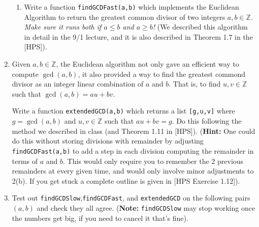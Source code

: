 \documentclass[11pt]{article}
\newcommand{\bZ}{\mathbb{Z}}
\begin{document}
\begin{enumerate}
{\begin{enumerate}
{    }
    \item{
    Write a function \verb|findGCDFast(a,b)| which implements the Euclidean Algorithm to return the greatest common divisor of two integers $a,b\in\bZ$.  \textit{Make sure it runs both if $a\le b$ and $a\ge b$!} (We described this algorithm in detail in the 9/1 lecture, and it is also described in Theorem 1.7 in the [HPS]).
    }
  \end{enumerate}
  }
  \item{
  Given $a,b\in\bZ$, the Euclidean algorithm not only gave an efficient way to compute $\gcd(a,b)$, it also provided a way to find the greatest commond divisor as an integer linear combination of $a$ and $b$.  That is, to find $u,v\in\bZ$ such that $\gcd(a,b) = au+bv$.

  Write a function \verb|extendedGCD(a,b)| which returns a list \verb|[g,u,v]| where $g=\gcd(a,b)$ and $u,v\in\bZ$ such that $au+bv = g$.  Do this following the method we described in class (and Theorem 1.11 in [HPS]).  (\textbf{Hint:} One could do this without storing divisions with remainder by adjusting \verb|findGCDFast(a,b)| to add a step in each division computing the remainder in terms of $a$ and $b$.  This would only require you to remember the 2 previous remainders at every given time, and would only involve minor adjustments to 2(b).  If you get stuck a complete outline is given in [HPS Exercise 1.12]).
  }
  \item{
  Test out \verb|findGCDSlow|,\verb|findGCDFast|, and \verb|extendedGCD| on the following pairs $(a,b)$ and check they all agree.  (\textbf{Note:} \verb|findGCDSlow| may stop working once the numbers get big, if you need to cancel it that's fine).
  }
\end{enumerate}
\end{document}
